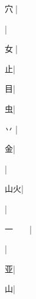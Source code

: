 \begin{multicols}{2}
{{\cjk{}{\cnsym{}　}穴{\cnxb{}𡗜}}|{}\par
{}|{}\par
{\cjk{}{\cnsym{}　}女{\cnxb{}𡗜}}|{}\par
{\cjk{}{\cnsym{}　}{\cnsym{}　}止}|{}\par
{\cjk{}{\cnsym{}　}{\cnsym{}　}目}|{}\par
{\cjk{}{\cnsym{}　}{\cnsym{}　}虫}|{}\par
{\cjk{}{\cnsym{}　}丷{\cnjzr{}}}|{}\par
{\cjk{}{\cnsym{}　}{\cnsym{}　}金}|{}\par
{}|{}\par
{\cjk{}{\cnsym{}　}山火}|{}\par
{}|{}\par
{\cjk{}一{\cnsym{}　}{\cnsym{}　}}|{}\par
{\cjk{}{\cnsym{}　}{\cnsym{}　}{\cnsym{}　}}|{}\par
{\cjk{}{\cnsym{}　}{\cnsym{}　}亚}|{}\par
{\cjk{}{\cnsym{}　}{\cnsym{}　}山}|{}\par
}
\end{multicols}
